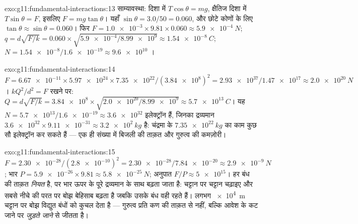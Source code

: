 \begin{solution}{exo:g11:fundamental-interactions:13}
साम्यावस्था:  दिशा में $T\cos\theta = mg$, क्षैतिज दिशा में $T\sin\theta = F$,
इसलिए $F = mg\tan\theta$। यहाँ $\sin\theta = 3.0/50 = 0.060$, और छोटे कोणों के लिए $\tan\theta \approx \sin\theta = 0.060$। फिर $F = \num{1.0e-3} \times 9.81 \times 0.060 \approx \qty{5.9e-4}{N}$; $q = d\sqrt{F/k} = 0.060 \times \sqrt{\num{5.9e-4}/\num{8.99e9}}
\approx \qty{1.54e-8}{C}$;
$N = \num{1.54e-8}/\num{1.6e-19} \approx
\num{9.6e10}$ ।
\end{solution}

\begin{solution}{exo:g11:fundamental-interactions:14}
$F = \num{6.67e-11} \times \num{5.97e24} \times \num{7.35e22} /
(\num{3.84e8})^2 = \num{2.93e37}/\num{1.47e17} \approx \qty{2.0e20}{N}$। $kQ^2/d^2 = F$ रखने पर: $Q = d\sqrt{F/k} = \num{3.84e8} \times \sqrt{\num{2.0e20}/\num{8.99e9}}
\approx \qty{5.7e13}{C}$। यह $N = \num{5.7e13}/\num{1.6e-19} \approx \num{3.6e32}$ इलेक्ट्रॉन हैं, जिनका द्रव्यमान
$\num{3.6e32} \times \num{9.11e-31} \approx \qty{3.2e2}{kg}$ है: चंद्रमा के $\qty{7.35e22}{kg}$ का काम कुछ सौ  इलेक्ट्रॉन कर
सकते हैं --- एक ही संख्या में बिजली की ताक़त और गुरुत्व की कमज़ोरी।
\end{solution}

\begin{solution}{exo:g11:fundamental-interactions:15}
$F = \num{2.30e-28}/(\num{2.8e-10})^2 = \num{2.30e-28}/\num{7.84e-20}
\approx \qty{2.9e-9}{N}$; भार $P = \num{5.9e-26} \times 9.81 \approx \qty{5.8e-25}{N}$; अनुपात $F/P \approx \num{5e15}$। हर बंध की ताक़त \emph{नियत} है, पर
भार ऊपर के पूरे द्रव्यमान के साथ बढ़ता जाता है: चट्टान पर चट्टान
चढ़ाइए और सबसे नीचे की परत पर बोझ बेहिसाब बढ़ता है जबकि उसके बंध वही रहते
हैं। लगभग \qty{e4}{m} चट्टान पर बोझ विद्युत बंधों को कुचल देता है --- गुरुत्व
प्रति कण की ताक़त से नहीं, बल्कि आवेश के कट जाने पर \emph{जुड़ते जाने} से
जीतता है।
\end{solution}

